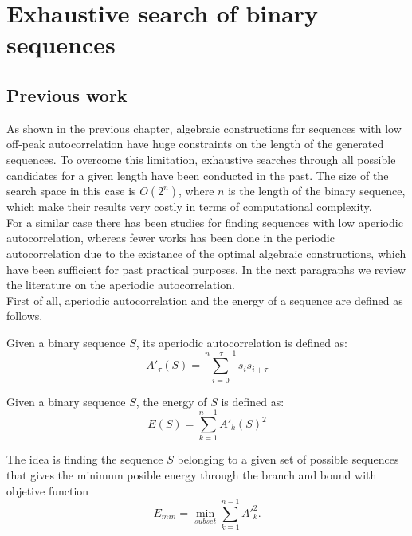 \chapter{Exhaustive search of binary sequences}
  \section{Previous work}

  As shown in the previous chapter, algebraic constructions for sequences
  with  low off-peak autocorrelation have huge constraints on the length of
  the generated sequences. To overcome this limitation, exhaustive searches
  through all possible candidates for a given length have been conducted in the past. The size of the search space in this case is  $O(2^n)$, where $n$ is the length of the binary sequence, which make their
 results very costly in terms of computational complexity.\\

For a similar case there has been studies for finding sequences with low aperiodic autocorrelation, whereas fewer works has been done in the periodic autocorrelation due to the existance of the optimal algebraic constructions, which have been sufficient for past practical purposes. In the next paragraphs  we review the literature on the aperiodic autocorrelation.\\

 First of all, aperiodic autocorrelation  and the energy of a sequence  are defined as follows.\\
  \begin{definition}
      Given a binary sequence $S$, its aperiodic autocorrelation is defined as:
      \begin{equation}
        A'_{\tau}(S) = \sum_{i=0}^{n-\tau-1}s_{i}s_{i+\tau}
      \end{equation}
  \end{definition}

  \begin{definition} Given a binary sequence $S$, the energy of $S$ is defined
    as:
    \begin{equation}
      E(S) = \sum_{k=1}^{n-1} A'_{k}(S)^{2}
    \end{equation}

  \end{definition}
The idea is finding the sequence $S$ belonging to a given set of possible sequences that gives the minimum posible energy through the branch and bound with objetive function
     \begin{equation}
      E_{min} = \operatorname*{min}_{subset} \sum_{k=1}^{n-1} A'^{2}_{k}.
    \end{equation}
    
